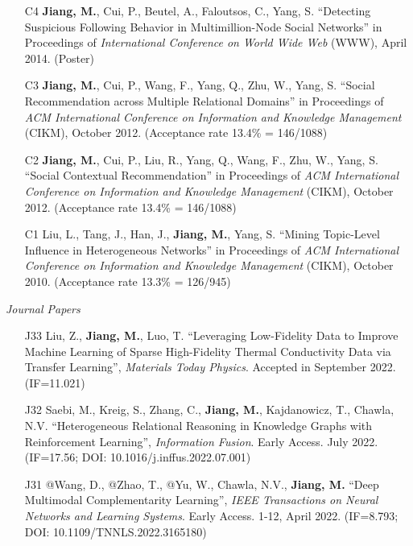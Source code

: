 \documentclass[10pt]{article}
\newenvironment{myindentpar}[1]%
{\begin{list}{}%
         {\setlength{\leftmargin}{#1}}%
         \item[]%
}
{\end{list}}
\newcounter{list}
\begin{document}
\begin{myindentpar}{0.00cm}
\begin{enumerate}[leftmargin=.5cm]
\item[C4] \textbf{Jiang, M.}, Cui, P., Beutel, A., Faloutsos, C., Yang, S. ``Detecting Suspicious Following Behavior in Multimillion-Node Social Networks'' in Proceedings of \textit{International Conference on World Wide Web} (WWW), April 2014. (Poster)

\item[C3] \textbf{Jiang, M.}, Cui, P., Wang, F., Yang, Q., Zhu, W., Yang, S. ``Social Recommendation across Multiple Relational Domains'' in Proceedings of \textit{ACM International Conference on Information and Knowledge Management} (CIKM), October 2012. (Acceptance rate 13.4\% = 146/1088)

\item[C2] \textbf{Jiang, M.}, Cui, P., Liu, R., Yang, Q., Wang, F., Zhu, W., Yang, S. ``Social Contextual Recommendation'' in Proceedings of \textit{ACM International Conference on Information and Knowledge Management} (CIKM), October 2012. (Acceptance rate 13.4\% = 146/1088)

\item[C1] Liu, L., Tang, J., Han, J., \textbf{Jiang, M.}, Yang, S. ``Mining Topic-Level Influence in Heterogeneous Networks'' in Proceedings of \textit{ACM International Conference on Information and Knowledge Management} (CIKM), October 2010. (Acceptance rate 13.3\% = 126/945)

\end{enumerate}

\hspace{-0.25cm}\textit{Journal Papers}

\begin{enumerate}[leftmargin=.5cm]

\item[J33] Liu, Z., \textbf{Jiang, M.}, Luo, T. ``Leveraging Low-Fidelity Data to Improve Machine Learning of Sparse High-Fidelity Thermal Conductivity Data via Transfer Learning'', \textit{Materials Today Physics}. Accepted in September 2022. (IF=11.021)

\item[J32] Saebi, M., Kreig, S., Zhang, C., \textbf{Jiang, M.}, Kajdanowicz, T., Chawla, N.V. ``Heterogeneous Relational Reasoning in Knowledge Graphs with Reinforcement Learning'', \textit{Information Fusion}. Early Access. July 2022. (IF=17.56; DOI: 10.1016/j.inffus.2022.07.001)

\item[J31] @Wang, D., @Zhao, T., @Yu, W., Chawla, N.V., \textbf{Jiang, M.} ``Deep Multimodal Complementarity Learning'', \textit{IEEE Transactions on Neural Networks and Learning Systems}. Early Access. 1-12, April 2022. (IF=8.793; DOI: 10.1109/TNNLS.2022.3165180)


\end{enumerate}
\end{myindentpar}
\end{document}
